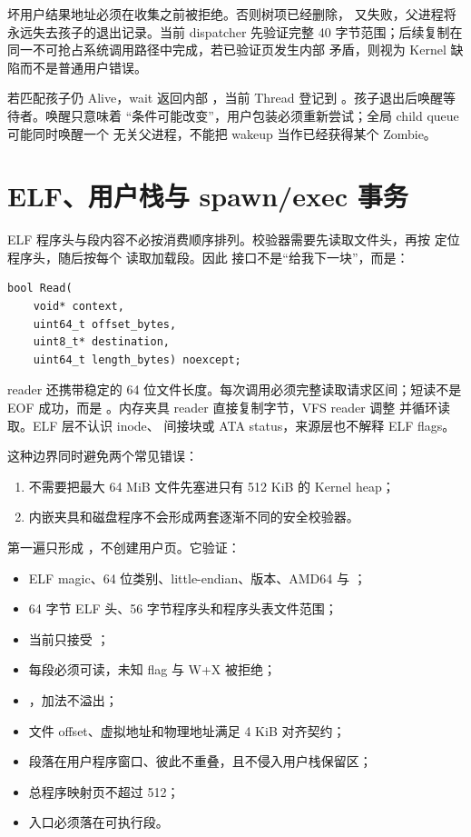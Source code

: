 坏用户结果地址必须在收集之前被拒绝。否则树项已经删除，
又失败，父进程将永远失去孩子的退出记录。当前 dispatcher 先验证完整 40
字节范围；后续复制在同一不可抢占系统调用路径中完成，若已验证页发生内部
矛盾，则视为 Kernel 缺陷而不是普通用户错误。

若匹配孩子仍 Alive，wait 返回内部 ，当前 Thread 登记到
。孩子退出后唤醒等待者。唤醒只意味着
“条件可能改变”，用户包装必须重新尝试；全局 child queue 可能同时唤醒一个
无关父进程，不能把 wakeup 当作已经获得某个 Zombie。

\section{ELF、用户栈与 spawn/exec 事务}

ELF 程序头与段内容不必按消费顺序排列。校验器需要先读取文件头，再按
 定位程序头，随后按每个  读取加载段。因此
接口不是“给我下一块”，而是：

\begin{lstlisting}[caption={来源无关的 ELF 精确读取契约}]
bool Read(
    void* context,
    uint64_t offset_bytes,
    uint8_t* destination,
    uint64_t length_bytes) noexcept;
\end{lstlisting}

reader 还携带稳定的 64 位文件长度。每次调用必须完整读取请求区间；短读不是
EOF 成功，而是 。内存夹具 reader 直接复制字节，VFS
reader 调整  并循环读取。ELF 层不认识 inode、
间接块或 ATA status，来源层也不解释 ELF flags。

这种边界同时避免两个常见错误：

\begin{enumerate}
  \item 不需要把最大 64 MiB 文件先塞进只有 512 KiB 的 Kernel heap；
  \item 内嵌夹具和磁盘程序不会形成两套逐渐不同的安全校验器。
\end{enumerate}

第一遍只形成 ，不创建用户页。它验证：

\begin{itemize}
  \item ELF magic、64 位类别、little-endian、版本、AMD64 与 ；
  \item 64 字节 ELF 头、56 字节程序头和程序头表文件范围；
  \item 当前只接受 ；
  \item 每段必须可读，未知 flag 与 W+X 被拒绝；
  \item {}，加法不溢出；
  \item 文件 offset、虚拟地址和物理地址满足 4 KiB 对齐契约；
  \item 段落在用户程序窗口、彼此不重叠，且不侵入用户栈保留区；
  \item 总程序映射页不超过 512；
  \item 入口必须落在可执行段。
\end{itemize}

